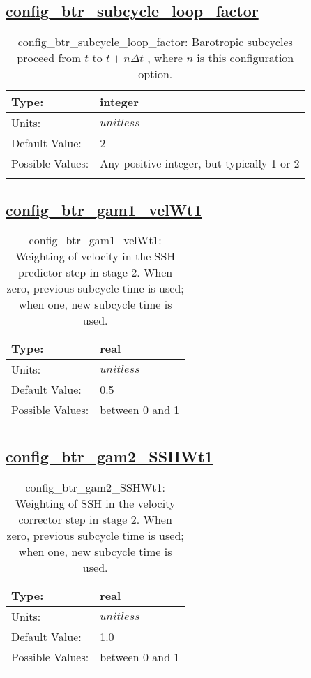 \subsection[config\_btr\_subcycle\_loop\_factor]{\hyperref[sec:nm_tab_split_explicit_ts]{config\_btr\_subcycle\_loop\_factor}}
\label{subsec:nm_sec_config_btr_subcycle_loop_factor}
\begin{center}
\begin{longtable}{| p{2.0in} | p{4.0in} |}
    \hline
    Type: & integer \\
    \hline
    Units: & $unitless$ \\
    \hline
    Default Value: & 2 \\
    \hline
    Possible Values: & Any positive integer, but typically 1 or 2 \\
    \hline
    \caption{config\_btr\_subcycle\_loop\_factor:  Barotropic subcycles proceed from  $t$  to  $t+n\Delta t$ , where  $n$  is this configuration option.}
\end{longtable}
\end{center}
\subsection[config\_btr\_gam1\_velWt1]{\hyperref[sec:nm_tab_split_explicit_ts]{config\_btr\_gam1\_velWt1}}
\label{subsec:nm_sec_config_btr_gam1_velWt1}
\begin{center}
\begin{longtable}{| p{2.0in} | p{4.0in} |}
    \hline
    Type: & real \\
    \hline
    Units: & $unitless$ \\
    \hline
    Default Value: & 0.5 \\
    \hline
    Possible Values: & between 0 and 1 \\
    \hline
    \caption{config\_btr\_gam1\_velWt1: Weighting of velocity in the SSH predictor step in stage 2.  When zero, previous subcycle time is used; when one, new subcycle time is used.}
\end{longtable}
\end{center}
\subsection[config\_btr\_gam2\_SSHWt1]{\hyperref[sec:nm_tab_split_explicit_ts]{config\_btr\_gam2\_SSHWt1}}
\label{subsec:nm_sec_config_btr_gam2_SSHWt1}
\begin{center}
\begin{longtable}{| p{2.0in} | p{4.0in} |}
    \hline
    Type: & real \\
    \hline
    Units: & $unitless$ \\
    \hline
    Default Value: & 1.0 \\
    \hline
    Possible Values: & between 0 and 1 \\
    \hline
    \caption{config\_btr\_gam2\_SSHWt1: Weighting of SSH in the velocity corrector step in stage 2.  When zero, previous subcycle time is used; when one, new subcycle time is used.}
\end{longtable}
\end{center}
